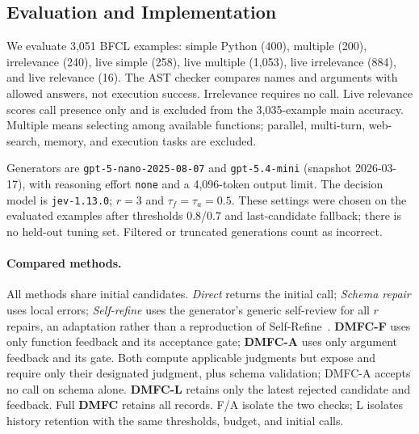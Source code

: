 \subsection{Evaluation and Implementation}
\label{sec:data}
We evaluate 3,051 BFCL examples: simple Python (400), multiple (200), irrelevance (240), live simple (258), live multiple (1,053), live irrelevance (884), and live relevance (16). The AST checker compares names and arguments with allowed answers, not execution success. Irrelevance requires no call. Live relevance scores call presence only and is excluded from the 3,035-example main accuracy. Multiple means selecting among available functions; parallel, multi-turn, web-search, memory, and execution tasks are excluded.

Generators are \texttt{gpt-5-nano-2025-08-07} and \texttt{gpt-5.4-mini} (snapshot 2026-03-17), with reasoning effort \texttt{none} and a 4,096-token output limit. The decision model is \texttt{jev-1.13.0}; $r=3$ and $\tau_f=\tau_a=0.5$. These settings were chosen on the evaluated examples after thresholds 0.8/0.7 and last-candidate fallback; there is no held-out tuning set. Filtered or truncated generations count as incorrect.

\paragraph{Compared methods.}
All methods share initial candidates. \emph{Direct} returns the initial call; \emph{Schema repair} uses local errors; \emph{Self-refine} uses the generator's generic self-review for all $r$ repairs, an adaptation rather than a reproduction of Self-Refine~\cite{madaan2023selfrefine}. \textbf{DMFC-F} uses only function feedback and its acceptance gate; \textbf{DMFC-A} uses only argument feedback and its gate. Both compute applicable judgments but expose and require only their designated judgment, plus schema validation; DMFC-A accepts no call on schema alone. \textbf{DMFC-L} retains only the latest rejected candidate and feedback. Full \textbf{DMFC} retains all records. F/A isolate the two checks; L isolates history retention with the same thresholds, budget, and initial calls.

